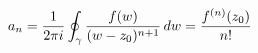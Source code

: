 \documentclass[preview]{standalone}
\begin{document}
\begin{align*}
\special{dvisvgm:raw <g id='unique000'>}a_n = \frac{1}{2\pi i}\oint_{\gamma} \frac{f(w)}{(w-z_0)^{n+1}}\, dw= \frac{f^{(n)}(z_0)}{n!}\special{dvisvgm:raw </g>}
\end{align*}
\end{document}

